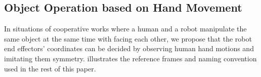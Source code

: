 
\subsection{Object Operation based on Hand Movement}
\label{subsec:move_hand}


In situations of cooperative works where a human and a robot manipulate the same object at the same time with facing each other, we propose that the robot end effectors' coordinates can be decided by observing human hand motions and imitating them symmetry.  illustrates the reference frames and naming convention used in the rest of this paper. %

